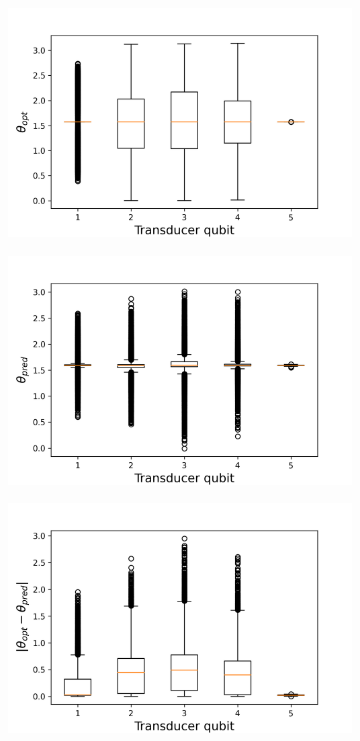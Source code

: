 \begin{figure}[H]
	\centering
	\begin{subfigure}{0.45\textwidth}
		\centering
		\includegraphics[width=\textwidth]{img/theta_opt_box2}
	\end{subfigure}
	\begin{subfigure}{0.45\textwidth}
		\centering
		\includegraphics[width=\textwidth]{img/theta_pred_box2}
	\end{subfigure}
	\begin{subfigure}{0.45\textwidth}
		\centering
		\includegraphics[width=\textwidth]{img/delta_theta_box2}

\end{subfigure}
\end{figure}

